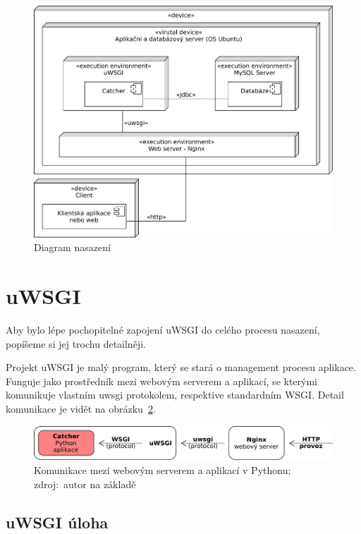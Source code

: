 \begin{figure}[ht!]
\centering
\includegraphics[width=130mm]{./images/diagram-nasazeni.pdf}
\caption{Diagram nasazení\label{overflow}}
\end{figure}

\section{uWSGI}

Aby bylo lépe pochopitelné zapojení uWSGI do celého procesu nasazení, popíšeme si jej trochu detailněji.

Projekt uWSGI je malý program, který se stará o management procesu aplikace.
Funguje jako prostředník mezi webovým serverem a aplikací,
se kterými komunikuje vlastním uwsgi protokolem, respektive standardním WSGI.
Detail komunikace je vidět na obrázku~\ref{fig:uwsgi}.

\begin{figure}[ht!]
\centering
\includegraphics[width=135mm]{./images/uwsgi.pdf}
\caption{Komunikace mezi webovým serverem a aplikací v Pythonu; zdroj:~autor na základě~\cite{uwsgi}\label{overflow}}
\label{fig:uwsgi}
\end{figure}

\subsection*{uWSGI úloha}


